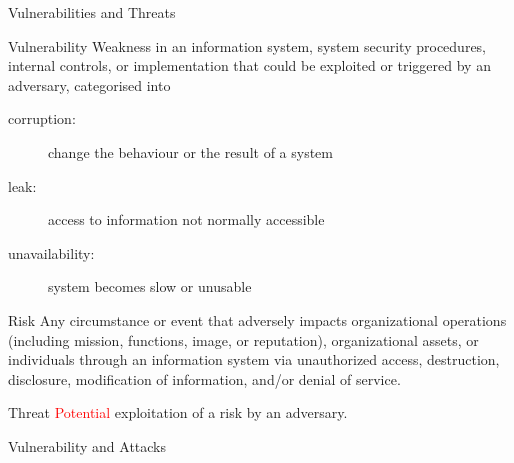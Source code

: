 \begin{reveals}
\begin{frame}[c]{Vulnerabilities and Threats}
  
  \begin{block}{Vulnerability}
    Weakness in an information system, system security procedures,
    internal controls, or implementation that could be exploited or
    triggered by an adversary, categorised into
    \begin{description}
    \item[corruption:] change the behaviour or the result of a system
    \item[leak:] access to information not normally accessible
    \item[unavailability:] system becomes slow or unusable
    \end{description}
  \end{block}

  \vfill

  \begin{block}{Risk}
    Any circumstance or event that adversely impacts organizational
    operations (including mission, functions, image, or reputation),
    organizational assets, or individuals through an information
    system via unauthorized access, destruction, disclosure,
    modification of information, and/or denial of service.
  \end{block}

  \vfill
  \begin{block}{Threat}
    \textcolor{red}{Potential} exploitation of a risk by an adversary.
  \end{block}

\end{frame}


\begin{frame}[c]{Vulnerability and Attacks}
   

\end{frame}
\end{reveals}

